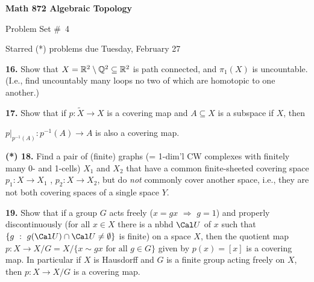 

\overfullrule=0pt
\parindent=0pt




\loadmsbm

\def\ctln{\centerline}
\def\u{\underbar}
\def\ssk{\smallskip}
\def\msk{\medskip}
\def\bsk{\bigskip}
\def\hsk{\hskip.1in}
\def\hhsk{\hskip.2in}

\def\dsl{\displaystyle}
\def\hskp{\hskip1.5in}
\def\ra{\rightarrow}
\def\lra{$\Leftrightarrow$}
\def\pu{\pi_1}
\def\mpu{$\pi_1$}
\def\bra{$\Rightarrow$}
\def\bbr{{\Bbb R}}
\def\bbz{{\Bbb Z}}
\def\bbq{{\Bbb Q}}
\def\del{\partial}
\def\indt{\item{}}
\def\wtl{\widetilde}



\ctln{\bf Math 872 Algebraic Topology}

\ssk

\ctln{Problem Set \#\ 4}

\ssk

\ctln{Starred (*) problems due Tuesday, February 27}

\bsk

\item{\bf 16.} Show that $X=\bbr^2\setminus\bbq^2\subseteq \bbr^2$ is path connected,
and $\pi_1(X)$ is uncountable. (I.e., find uncountably many loops no two of which are
homotopic to one another.)

\msk

\item{\bf 17.} Show that if $p:\wtl{X}\ra X$ is a covering map and $A\subseteq X$ is
a subspace if $X$, then 

\item{}$p|_{p^{-1}(A)}:p^{-1}(A)\ra A$ is also a covering map.

\msk

\item{\bf (*) 18.} Find a pair of (finite) graphs (= 1-dim'l CW complexes with finitely
many 0- and 1-cells) $X_1$ and $X_2$ that have a common finite-sheeted covering space 
$p_1:X\ra X_1$ , $p_2:X\ra X_2$, but do {\it not} commonly cover another space, i.e., 
they are not both covering spaces of a single space $Y$.

\msk

\item{\bf 19.} Show that if a group $G$ acts freely ($x=gx$ $\Rightarrow$ $g=1$)
and properly discontinuously (for all $x\in X$ there is a nbhd ${\Cal U}$ of $x$ such that
$\{g\ :\ g({\Cal U})\cap{\Cal U}\neq\emptyset\}$ is finite)
on a space $X$, then the quotient map $p:X\ra X/G=X/\{x\sim gx \text{\ for all\ } g\in G\}$
given by $p(x)=[x]$
is a covering map. In particular if $X$ is Hausdorff and $G$ is a finite group acting freely on $X$,
then $p:X\ra X/G$ is a covering map. 

